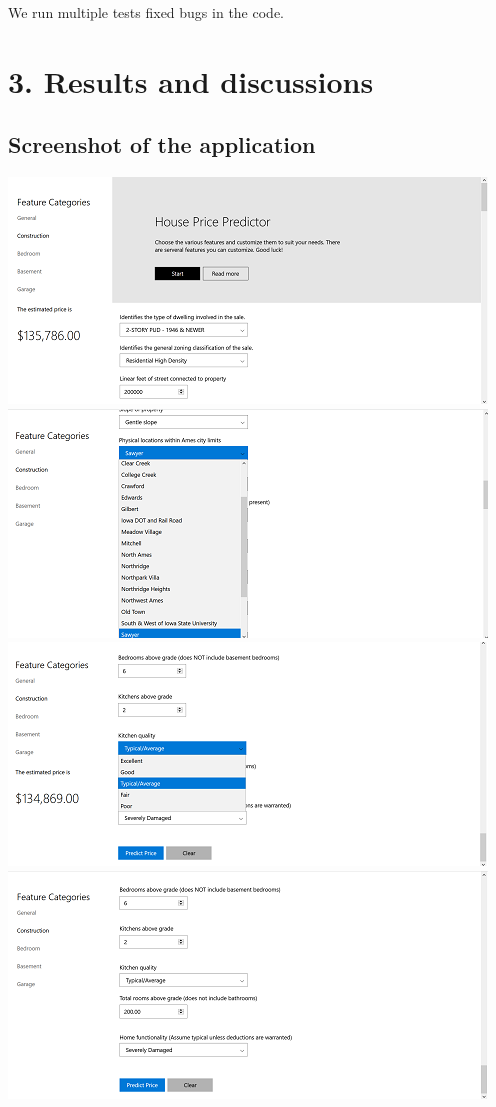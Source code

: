 We run multiple tests fixed bugs in the code.

\section{3. Results and discussions}\label{results-and-discussions}

\subsection{Screenshot of the
application}\label{screenshot-of-the-application}

\includegraphics{images/screenshot-01.png}
\includegraphics{images/screenshot-02.png}
\includegraphics{images/screenshot-04.png}
\includegraphics{images/screenshot-03.png}

